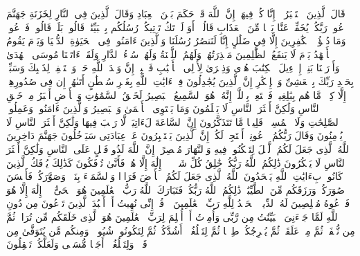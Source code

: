 \stopbuffer
\startbuffer[\q:40:48]
قَالَ ٱلَّذِینَ ٱسۡتَكۡبَرُوۤا۟ إِنَّا كُلࣱّ فِیهَاۤ إِنَّ ٱللَّهَ قَدۡ حَكَمَ بَیۡنَ ٱلۡعِبَادِ%
\stopbuffer
\startbuffer[\q:40:49]
وَقَالَ ٱلَّذِینَ فِی ٱلنَّارِ لِخَزَنَةِ جَهَنَّمَ ٱدۡعُوا۟ رَبَّكُمۡ یُخَفِّفۡ عَنَّا یَوۡمࣰا مِّنَ ٱلۡعَذَابِ%
\stopbuffer
\startbuffer[\q:40:50]
قَالُوۤا۟ أَوَ لَمۡ تَكُ تَأۡتِیكُمۡ رُسُلُكُم بِٱلۡبَیِّنَٰتِۖ قَالُوا۟ بَلَىٰۚ قَالُوا۟ فَٱدۡعُوا۟ۗ وَمَا دُعَٰۤؤُا۟ ٱلۡكَٰفِرِینَ إِلَّا فِی ضَلَٰلٍ%
\stopbuffer
\startbuffer[\q:40:51]
إِنَّا لَنَنصُرُ رُسُلَنَا وَٱلَّذِینَ ءَامَنُوا۟ فِی ٱلۡحَیَوٰةِ ٱلدُّنۡیَا وَیَوۡمَ یَقُومُ ٱلۡأَشۡهَٰدُ%
\stopbuffer
\startbuffer[\q:40:52]
یَوۡمَ لَا یَنفَعُ ٱلظَّٰلِمِینَ مَعۡذِرَتُهُمۡۖ وَلَهُمُ ٱللَّعۡنَةُ وَلَهُمۡ سُوۤءُ ٱلدَّارِ%
\stopbuffer
\startbuffer[\q:40:53]
وَلَقَدۡ ءَاتَیۡنَا مُوسَى ٱلۡهُدَىٰ وَأَوۡرَثۡنَا بَنِیۤ إِسۡرَٰۤءِیلَ ٱلۡكِتَٰبَ%
\stopbuffer
\startbuffer[\q:40:54]
هُدࣰى وَذِكۡرَىٰ لِأُو۟لِی ٱلۡأَلۡبَٰبِ%
\stopbuffer
\startbuffer[\q:40:55]
فَٱصۡبِرۡ إِنَّ وَعۡدَ ٱللَّهِ حَقࣱّ وَٱسۡتَغۡفِرۡ لِذَنۢبِكَ وَسَبِّحۡ بِحَمۡدِ رَبِّكَ بِٱلۡعَشِیِّ وَٱلۡإِبۡكَٰرِ%
\stopbuffer
\startbuffer[\q:40:56]
إِنَّ ٱلَّذِینَ یُجَٰدِلُونَ فِیۤ ءَایَٰتِ ٱللَّهِ بِغَیۡرِ سُلۡطَٰنٍ أَتَىٰهُمۡ إِن فِی صُدُورِهِمۡ إِلَّا كِبۡرࣱ مَّا هُم بِبَٰلِغِیهِۚ فَٱسۡتَعِذۡ بِٱللَّهِۖ إِنَّهُۥ هُوَ ٱلسَّمِیعُ ٱلۡبَصِیرُ%
\stopbuffer
\startbuffer[\q:40:57]
لَخَلۡقُ ٱلسَّمَٰوَٰتِ وَٱلۡأَرۡضِ أَكۡبَرُ مِنۡ خَلۡقِ ٱلنَّاسِ وَلَٰكِنَّ أَكۡثَرَ ٱلنَّاسِ لَا یَعۡلَمُونَ%
\stopbuffer
\startbuffer[\q:40:58]
وَمَا یَسۡتَوِی ٱلۡأَعۡمَىٰ وَٱلۡبَصِیرُ وَٱلَّذِینَ ءَامَنُوا۟ وَعَمِلُوا۟ ٱلصَّٰلِحَٰتِ وَلَا ٱلۡمُسِیۤءُۚ قَلِیلࣰا مَّا تَتَذَكَّرُونَ%
\stopbuffer
\startbuffer[\q:40:59]
إِنَّ ٱلسَّاعَةَ لَءَاتِیَةࣱ لَّا رَیۡبَ فِیهَا وَلَٰكِنَّ أَكۡثَرَ ٱلنَّاسِ لَا یُؤۡمِنُونَ%
\stopbuffer
\startbuffer[\q:40:60]
وَقَالَ رَبُّكُمُ ٱدۡعُونِیۤ أَسۡتَجِبۡ لَكُمۡۚ إِنَّ ٱلَّذِینَ یَسۡتَكۡبِرُونَ عَنۡ عِبَادَتِی سَیَدۡخُلُونَ جَهَنَّمَ دَاخِرِینَ%
\stopbuffer
\startbuffer[\q:40:61]
ٱللَّهُ ٱلَّذِی جَعَلَ لَكُمُ ٱلَّیۡلَ لِتَسۡكُنُوا۟ فِیهِ وَٱلنَّهَارَ مُبۡصِرًاۚ إِنَّ ٱللَّهَ لَذُو فَضۡلٍ عَلَى ٱلنَّاسِ وَلَٰكِنَّ أَكۡثَرَ ٱلنَّاسِ لَا یَشۡكُرُونَ%
\stopbuffer
\startbuffer[\q:40:62]
ذَٰلِكُمُ ٱللَّهُ رَبُّكُمۡ خَٰلِقُ كُلِّ شَیۡءࣲ لَّاۤ إِلَٰهَ إِلَّا هُوَۖ فَأَنَّىٰ تُؤۡفَكُونَ%
\stopbuffer
\startbuffer[\q:40:63]
كَذَٰلِكَ یُؤۡفَكُ ٱلَّذِینَ كَانُوا۟ بِءَایَٰتِ ٱللَّهِ یَجۡحَدُونَ%
\stopbuffer
\startbuffer[\q:40:64]
ٱللَّهُ ٱلَّذِی جَعَلَ لَكُمُ ٱلۡأَرۡضَ قَرَارࣰا وَٱلسَّمَاۤءَ بِنَاۤءࣰ وَصَوَّرَكُمۡ فَأَحۡسَنَ صُوَرَكُمۡ وَرَزَقَكُم مِّنَ ٱلطَّیِّبَٰتِۚ ذَٰلِكُمُ ٱللَّهُ رَبُّكُمۡۖ فَتَبَارَكَ ٱللَّهُ رَبُّ ٱلۡعَٰلَمِینَ%
\stopbuffer
\startbuffer[\q:40:65]
هُوَ ٱلۡحَیُّ لَاۤ إِلَٰهَ إِلَّا هُوَ فَٱدۡعُوهُ مُخۡلِصِینَ لَهُ ٱلدِّینَۗ ٱلۡحَمۡدُ لِلَّهِ رَبِّ ٱلۡعَٰلَمِینَ%
\stopbuffer
\startbuffer[\q:40:66]
۞ قُلۡ إِنِّی نُهِیتُ أَنۡ أَعۡبُدَ ٱلَّذِینَ تَدۡعُونَ مِن دُونِ ٱللَّهِ لَمَّا جَاۤءَنِیَ ٱلۡبَیِّنَٰتُ مِن رَّبِّی وَأُمِرۡتُ أَنۡ أُسۡلِمَ لِرَبِّ ٱلۡعَٰلَمِینَ%
\stopbuffer
\startbuffer[\q:40:67]
هُوَ ٱلَّذِی خَلَقَكُم مِّن تُرَابࣲ ثُمَّ مِن نُّطۡفَةࣲ ثُمَّ مِنۡ عَلَقَةࣲ ثُمَّ یُخۡرِجُكُمۡ طِفۡلࣰا ثُمَّ لِتَبۡلُغُوۤا۟ أَشُدَّكُمۡ ثُمَّ لِتَكُونُوا۟ شُیُوخࣰاۚ وَمِنكُم مَّن یُتَوَفَّىٰ مِن قَبۡلُۖ وَلِتَبۡلُغُوۤا۟ أَجَلࣰا مُّسَمࣰّى وَلَعَلَّكُمۡ تَعۡقِلُونَ%
\stopbuffer
